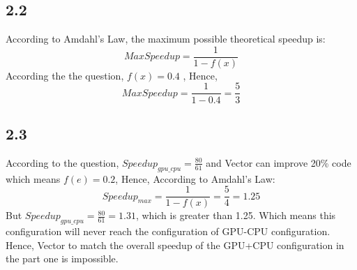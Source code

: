 \documentclass[a4paper,11pt,fleqn]{article}
\theoremstyle{mytheor}
\begin{document}
\subsection*{2.2}
According to Amdahl's Law, the maximum possible theoretical speedup is:
\begin{equation}
Max Speedup = \frac{1}{1 - f(x)}
\nonumber
\end{equation}
According the the question, $f(x) = 0.4$ , Hence, 
\begin{equation}
Max Speedup = \frac{1}{1 - 0.4} =\frac{5}{3}
\nonumber
\end{equation}

\subsection*{2.3}
According to the question, $Speedup_{gpu\_cpu} = \frac{80}{61}$ and Vector can improve 20\% code which means $f(e) = 0.2$, Hence, According to Amdahl's Law:
\begin{equation}
Speedup_{max} = \frac{1}{1 - f(x)} = \frac{5}{4} = 1.25
\nonumber
\end{equation}
But $Speedup_{gpu\_cpu} = \frac{80}{61} = 1.31$, which is greater than 1.25. Which means this configuration will never reach the configuration of GPU-CPU configuration.\\
Hence,  Vector to match the overall speedup of the GPU+CPU configuration in the part one  is impossible.
\end{document}
